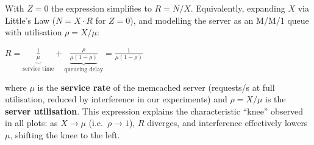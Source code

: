 \begin{enumerate}[label=(\alph*)]
\begin{itemize}
        With $Z = 0$ the expression simplifies to $R = N / X$.
        Equivalently, expanding $X$ via Little's Law ($N = X \cdot R$
        for $Z=0$), and modelling the server as an M/M/1 queue
        with utilisation $\rho = X/\mu$:
        
        $
          R = \underbrace{\frac{1}{\mu}}_{\text{service time}} +
              \underbrace{\frac{\rho}{\mu(1-\rho)}}_{\text{queueing delay}}
            = \frac{1}{\mu(1-\rho)}
        $
        
        where $\mu$ is the \textbf{service rate} of the memcached server
        (requests/s at full utilisation, reduced by interference in our
        experiments) and $\rho = X/\mu$ is the \textbf{server utilisation}.
        This expression explains the characteristic ``knee'' observed in
        all plots: as $X \to \mu$ (i.e.\ $\rho \to 1$), $R$ diverges,
        and interference effectively lowers $\mu$, shifting the knee
        to the left.
        
    \end{itemize}
            
\end{enumerate}

    
